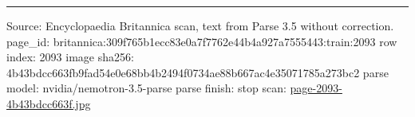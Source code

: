 \documentclass[10pt]{article}
\begin{document}
\vfill\par\noindent\rule{\linewidth}{0.4pt}\par
{\scriptsize\color{gray}\noindent Source: Encyclopaedia Britannica scan, text from Parse 3.5 without correction. page\_id: britannica:309f765b1ecc83e0a7f7762e44b4a927a7555443:train:2093 \quad row index: 2093 \quad image sha256: 4b43bdcc663fb9fad54e0e68bb4b2494f0734ae88b667ac4e35071785a273bc2 \quad parse model: nvidia/nemotron-3.5-parse \quad parse finish: stop \quad scan: \href{../scans/page-2093-4b43bdcc663f.jpg}{page-2093-4b43bdcc663f.jpg}\par}
\end{document}
